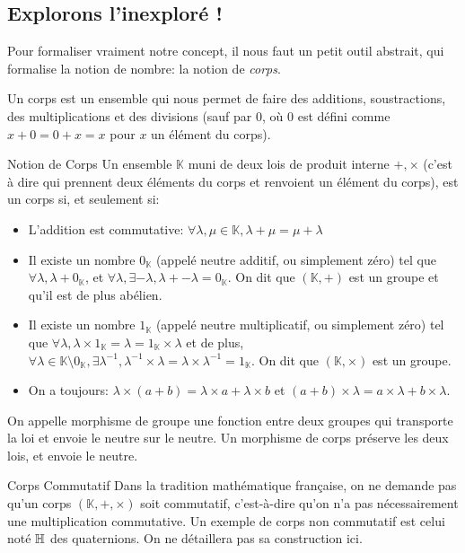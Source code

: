 \documentclass{classe}
\renewcommand*{\K}{\mathbb{K}}
\begin{document}
\subsection{Explorons l'inexploré !}

Pour formaliser vraiment notre concept, il nous faut un petit outil abstrait, qui formalise la notion de nombre: la notion de \emph{corps}.

Un corps est un ensemble qui nous permet de faire des additions, soustractions, des multiplications et des divisions (sauf par $0$, où $0$ est défini comme $x+0 = 0+x = x$ pour $x$ un élément du corps).

\begin{définition}{Notion de Corps}{}
	Un ensemble $\K$ muni de deux lois de produit interne $+, \times$ (c'est à dire qui prennent deux éléments du corps et renvoient un élément du corps), est un corps si, et seulement si:
	\begin{itemize}
		\item L'addition est commutative: $\forall \lambda, \mu \in \K, \lambda + \mu = \mu + \lambda$
		\item Il existe un nombre $0_{\K}$ (appelé neutre additif, ou simplement zéro) tel que $\forall \lambda, \lambda + 0_{\K}$, et $\forall \lambda, \exists -\lambda, \lambda + -\lambda = 0_{\K}$. On dit que $\left(\K, +\right)$ est un groupe et qu'il est de plus abélien.
		\item Il existe un nombre $1_{\K}$ (appelé neutre multiplicatif, ou simplement zéro) tel que $\forall \lambda, \lambda \times 1_{\K} = \lambda = 1_{\K} \times \lambda$ et de plus, $\forall \lambda \in \K\setminus 0_{\K}, \exists \lambda^{-1}, \lambda^{-1} \times \lambda = \lambda \times \lambda^{-1} = 1_{\K}$. On dit que $\left(\K, \times\right)$ est un groupe.
		\item On a toujours: $\lambda \times \left( a + b \right) = \lambda \times a + \lambda \times b$ et $\left( a + b\right)\times \lambda = a\times \lambda + b\times \lambda$.
	\end{itemize}
\end{définition}

On appelle morphisme de groupe une fonction entre deux groupes qui transporte la loi et envoie le neutre sur le neutre. Un morphisme de corps préserve les deux lois, et envoie le neutre.

\begin{remarque}{Corps Commutatif}{}
	Dans la tradition mathématique française, on ne demande pas qu'un corps $\left( \K, +, \times \right)$ soit commutatif, c'est-à-dire qu'on n'a pas nécessairement une multiplication commutative.
	Un exemple de corps non commutatif est celui noté $\mathbb{H}$ des quaternions. On ne détaillera pas sa construction ici.
\end{remarque}
\end{document}
